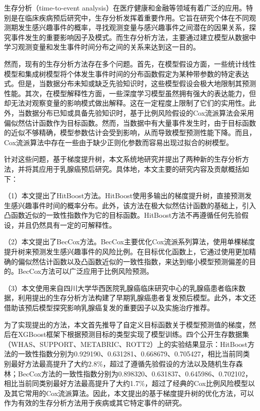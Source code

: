 	
\begin{chineseabstract}
    生存分析（time-to-event analysis）在医疗健康和金融等领域有着广泛的应用。特别是在临床疾病预后研究中，生存分析发挥着重要作用。它旨在研究个体在不同观测期发生感兴趣事件的概率，寻找观测变量与感兴趣事件之间潜在的因果关系，探究事件发生的重要影响因子及模式。而生存分析方法，主要通过建立模型从数据中学习观测变量和发生事件时间分布之间的关系来达到这一目的。

    然而，现有的生存分析方法存在多个问题。首先，在模型假设方面，一些统计线性模型和集成树模型将个体发生事件时间的分布函数假定为某种带参数的特定表达式。但是，当数据分布未知或缺乏先验知识时，这些模型假设会极大地限制其预测性能。其次，在模型解释性方面，一些深度学习模型虽然拥有强大的表达能力，但却无法对观察变量的影响模式做出解释。这在一定程度上限制了它们的实用性。此外，当数据分布已知或具备先验知识时，基于比例风险假设的Cox流派算法会采用偏似然估计函数作为目标函数。然而，当数据中有大量事件发生时，由于目标函数的近似不够精确，模型参数估计会受到影响，从而导致模型预测性能下降。而且，Cox流派算法中存在一些由于缺少正则化参数而容易出现过拟合的树模型。

    针对这些问题，基于梯度提升树，本文系统地研究并提出了两种新的生存分析方法，并将其应用于乳腺癌预后研究。具体地，本文主要的研究内容及贡献概括如下：

    （1）本文提出了HitBoost方法。HitBoost使用多输出的梯度提升树，直接预测发生感兴趣事件时间的概率分布。此外，该方法在极大似然估计函数的基础上，引入凸函数近似的一致性指数作为它的目标函数。HitBoost方法不再遵循任何先验假设，并且仍然具有一定的可解释性。
    
    （2）本文提出了BecCox方法。BecCox主要优化Cox流派系列算法，使用单棵梯度提升树来预测发生感兴趣事件的风险比例。在目标优化函数上，它通过使用更加精确的偏似然估计函数以及凸函数近似的一致性指数，来达到缩小模型预测偏差的目的。BecCox方法可以广泛应用于比例风险预测。
    
    （3）本文使用来自四川大学华西医院乳腺癌临床研究中心的乳腺癌患者临床数据，利用提出的生存分析方法构建了早期乳腺癌患者复发预后模型。此外，本文还借助该预后模型探究影响乳腺癌复发的重要因子以及实施治疗推荐。

    为了实现提出的方法，本文首先推导了自定义目标函数关于模型预测值的梯度，然后在XGBoost框架下根据预测目标的类型实现了模型训练。四个公开生存数据集（WHAS、SUPPORT、METABRIC、ROTT2）上的实验结果显示：HitBoost方法的一致性指数分别为0.929190、0.631281、0.668679、0.705427，相比当前同类别最好方法最高提升了大约2.8\%，超过了遵循先验假设的方法以及随机生存森林；BecCox方法的一致性指数分别为0.898320、0.631837、0.645986、0.702102，相比当前同类别最好方法最高提升了大约1.7\%，超过了经典的Cox比例风险模型以及其它常用的Cox流派算法。因此，本文提出的基于梯度提升树的优化方法，可以作为有效的生存分析方法用于疾病或其它特定事件的研究。

\end{chineseabstract}

